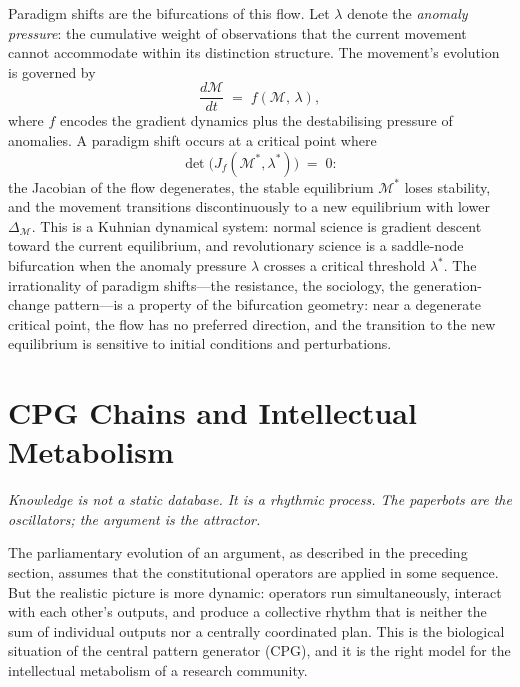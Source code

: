 \documentclass[12pt, letterpaper]{article}
\theoremstyle{remark}
\begin{document}
Paradigm shifts are the bifurcations of this flow.  Let $\lambda$ denote
the \emph{anomaly pressure}: the cumulative weight of observations that
the current movement cannot accommodate within its distinction structure.
The movement's evolution is governed by
\begin{equation}
  \frac{d\mathcal{M}}{dt} \;=\; f(\mathcal{M},\, \lambda),
\end{equation}
where $f$ encodes the gradient dynamics plus the destabilising pressure of
anomalies.  A paradigm shift occurs at a critical point where
\begin{equation}
  \det\bigl(J_f(\mathcal{M}^*, \lambda^*)\bigr) \;=\; 0:
\end{equation}
the Jacobian of the flow degenerates, the stable equilibrium $\mathcal{M}^*$
loses stability, and the movement transitions discontinuously to a new
equilibrium with lower $\Delta_{\mathcal{M}}$.  This is a Kuhnian dynamical
system: normal science is gradient descent toward the current equilibrium,
and revolutionary science is a saddle-node bifurcation when the anomaly
pressure $\lambda$ crosses a critical threshold $\lambda^*$.  The
irrationality of paradigm shifts---the resistance, the sociology, the
generation-change pattern---is a property of the bifurcation geometry:
near a degenerate critical point, the flow has no preferred direction, and
the transition to the new equilibrium is sensitive to initial conditions
and perturbations.

\section{CPG Chains and Intellectual Metabolism}

\epigraph{\itshape Knowledge is not a static database.  It is a rhythmic
process.  The paperbots are the oscillators; the argument is the
attractor.}{}

The parliamentary evolution of an argument, as described in the preceding
section, assumes that the constitutional operators are applied in some
sequence.  But the realistic picture is more dynamic: operators run
simultaneously, interact with each other's outputs, and produce a collective
rhythm that is neither the sum of individual outputs nor a centrally
coordinated plan.  This is the biological situation of the central pattern
generator (CPG), and it is the right model for the intellectual metabolism
of a research community.
\end{document}
